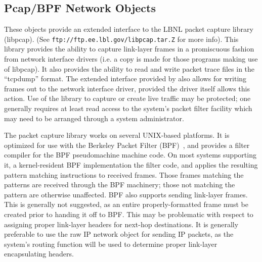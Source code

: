 \subsection{Pcap/BPF Network Objects}

These objects provide an extended interface to the LBNL packet capture
library (libpcap).
(See {\tt ftp://ftp.ee.lbl.gov/libpcap.tar.Z} for more info).
This library provides the ability to capture link-layer frames
in a promiscuous fashion from network interface drivers
(i.e. a copy is made for those programs making use of libpcap).
It also provides the ability to read and write packet trace
files in the ``tcpdump'' format.
The extended interface provided by \ns also allows for writing
frames out to the network interface driver, provided the driver
itself allows this action.
Use of the library to capture or create live traffic may be protected;
one generally requires at least read access to the system's packet filter
facility which may need to be arranged through a system administrator.

The packet capture library works on several UNIX-based platforms.
It is optimized for use with the Berkeley Packet Filter (BPF)~\cite{BPF},
and provides a filter compiler for the BPF pseudomachine machine code.
On most systems supporting it,
a kernel-resident BPF implementation the filter code, and 
applies the resulting pattern matching instructions to received frames.
Those frames matching the patterns are received through the BPF machinery;
those not matching the pattern are otherwise unaffected.
BPF also supports sending link-layer frames.
This is generally not suggested, as an entire properly-formatted frame
must be created prior to handing it off to BPF.
This may be problematic with respect to assigning proper link-layer headers
for next-hop destinations.
It is generally preferable to use the raw IP network object for sending
IP packets, as the system's routing function will be used to determine
proper link-layer encapsulating headers.


